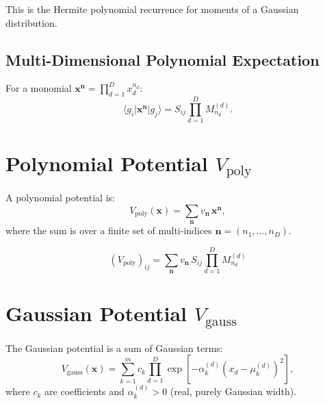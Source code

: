 \documentclass[11pt,a4paper]{article}
\theoremstyle{definition}
\begin{document}
This is the Hermite polynomial recurrence for moments of a Gaussian distribution.

\subsection{Multi-Dimensional Polynomial Expectation}

For a monomial $\bm{x}^{\bm{n}} = \prod_{d=1}^{D} x_d^{n_d}$:
\begin{equation}
\langle g_i | \bm{x}^{\bm{n}} | g_j \rangle = S_{ij} \prod_{d=1}^{D} M_{n_d}^{(d)}.
\end{equation}

\section{Polynomial Potential $V_{\text{poly}}$}

A polynomial potential is:
\begin{equation}
V_{\text{poly}}(\bm{x}) = \sum_{\bm{n}} v_{\bm{n}} \, \bm{x}^{\bm{n}},
\end{equation}
where the sum is over a finite set of multi-indices $\bm{n} = (n_1, \ldots, n_D)$.

\begin{tcolorbox}[colback=red!5,colframe=red!50!black,title=Polynomial Potential Matrix]
\begin{equation}
(V_{\text{poly}})_{ij} = \sum_{\bm{n}} v_{\bm{n}} \, S_{ij} \prod_{d=1}^{D} M_{n_d}^{(d)}
\end{equation}
\end{tcolorbox}

\section{Gaussian Potential $V_{\text{gauss}}$}

The Gaussian potential is a sum of Gaussian terms:
\begin{equation}
V_{\text{gauss}}(\bm{x}) = \sum_{k=1}^{m} c_k \prod_{d=1}^{D} \exp\left[ -\alpha_k^{(d)} (x_d - \mu_k^{(d)})^2 \right],
\end{equation}
where $c_k$ are coefficients and $\alpha_k^{(d)} > 0$ (real, purely Gaussian width).
\end{document}
